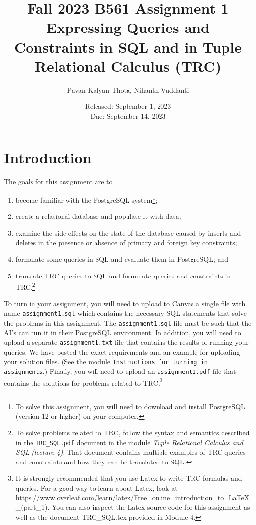 \documentclass{article}
\begin{document}
\title{Fall 2023 B561 Assignment 1 \\
Expressing Queries and Constraints in SQL and in Tuple Relational Calculus (TRC)}
\author{Pavan Kalyan Thota, Nihanth Vuddanti}
\date{Released: September 1, 2023\\ Due: September 14, 2023 }
\maketitle


\section{Introduction}

The goals for this assignment are to 
\begin{enumerate}
\item become familiar with the PostgreSQL system\footnote{To solve this assignment, you will need to download and install PostgreSQL (version 12 or higher) on your computer.};
\item create a relational database and populate it with data;
\item examine the side-effects on the state of the database caused by inserts and deletes in the presence or absence
of primary and foreign key constraints;
\item formulate some queries in SQL and evaluate them in PostgreSQL; and
\item translate TRC queries to SQL and 
formulate queries and constraints in TRC.\footnote{To solve problems related to TRC, follow the syntax and semantics described in the {\tt TRC\_SQL.pdf} document
in the module \emph{Tuple Relational Calculus and SQL (lecture 4)}.   That document contains multiple examples of
TRC queries and constraints and how they can be translated to SQL.}
\end{enumerate}

To turn in your assignment, you will need to upload to Canvas a single file with name {\tt assignment1.sql} which contains 
the necessary SQL statements that solve the problems in this assignment.   
The {\tt assignment1.sql} file must be such that the AI's can run it in their PostgreSQL environment.  
In addition, you will need to upload a separate {\tt assignment1.txt} file that contains the results of running
your queries.
We have posted the exact requirements and an example for uploading your solution files.  (See the module
{\tt Instructions for turning in assignments}.)
Finally, you will need to upload an {\tt assignment1.pdf} file that contains the solutions for problems related to TRC.\footnote{It is strongly recommended that you use Latex to write TRC formulas and queries.
For a good way to learn about Latex, look at 
https://www.overleaf.com/learn/latex/Free\_online\_introduction\_to\_LaTeX\_(part\_1).
You can also inspect the Latex source code for this assignment as well as the document TRC\_SQL.tex provided in Module 4.}
\end{document}
